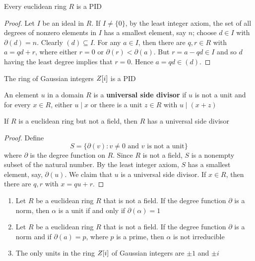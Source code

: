 \documentclass[11pt]{article}
\begin{document}
\begin{theorem}[]
\label{thm3.60}
Every euclidean ring \(R\) is a PID
\end{theorem}

\begin{proof}
Let \(I\) be an ideal in \(R\). If \(I\neq\{0\}\), by the least integer axiom, the
set of all degrees of nonzero elements in \(I\) has a smallest element, say
\(n\); choose \(d\in I\) with \(\partial(d)=n\). Clearly \((d)\subseteq I\). For any
\(a\in I\), then there are \(q,r\in R\) with \(a=qd+r\), where either \(r=0\)
or \(\partial(r)<\partial(a)\). But \(r=a-qd\in I\) and so \(d\) having the least degree
implies that \(r=0\). Hence \(a=qd\in(d)\).
\end{proof}

\begin{corollary}[]
The ring of Gaussian integers \(\relax{Z}[i]\) is a PID
\end{corollary}

\begin{definition}[]
An element \(u\) in a domain \(R\) is a \textbf{universal side divisor} if \(u\) is not a unit
and for every \(x\in R\), either \(u\mid x\) or there is a unit \(z\in R\) with \(u\mid(x+z)\)
\end{definition}


\begin{proposition}[]
If \(R\) is a euclidean ring but not a field, then \(R\) has a universal side divisor
\end{proposition}

\begin{proof}
Define 
\begin{equation*}
S=\{\partial(v):v\neq 0\text{ and }v\text{ is not a unit}\}
\end{equation*}
where \(\partial\) is the degree function on \(R\). Since \(R\) is not a field, \(S\) is a
nonempty subset of the natural number. By the least integer axiom, \(S\) has a
smallest element, say, \(\partial(u)\). We claim that \(u\) is a universal side
divisor. If \(x\in R\), then there are \(q,r\) with \(x=qu+r\).
\end{proof}

\begin{proposition}[]
\label{prop3.64}
\begin{enumerate}
\item Let \(R\) be a euclidean ring \(R\) that is not a field. If the degree function
\(\partial\) is a norm, then \(\alpha\) is a unit if and only if \(\partial(\alpha)=1\)
\item Let \(R\) be a euclidean ring \(R\) that is not a field. If the degree function
\(\partial\) is a norm and if \(\partial(a)=p\), where \(p\) is a prime, then \(\alpha\) is not
irreducible
\item The only units in the ring \(\relax{Z}[i]\) of Gaussian integers are \(\pm1\) and
\(\pm i\)
\end{enumerate}
\end{proposition}
\end{document}
